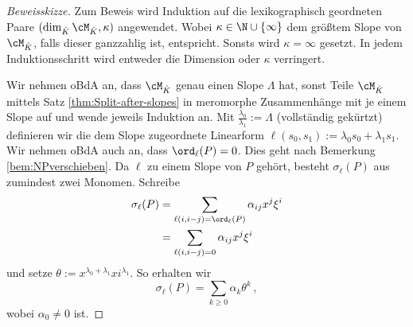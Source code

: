 \begin{proof}[Beweisskizze]
Zum Beweis wird Induktion auf die lexikographisch geordneten Paare
$(\dim_{\hat K}\cM_{\hat K},\kappa)$ angewendet. Wobei
$\kappa\in\N\cup\{\infty\}$ dem größtem Slope von $\cM_{\hat K}$, falls dieser
ganzzahlig ist, entspricht. Sonsts wird $\kappa=\infty$ gesetzt. In jedem
Induktionsschritt wird entweder die Dimension oder $\kappa$ verringert.

\begin{comment}
TODO: Induktionsanfang und -schritt kennzeichnen
\end{comment}
Wir nehmen oBdA an, dass $\cM_{\hat K}$ genau einen Slope $\Lambda$ hat, sonst
Teile $\cM_{\hat K}$ mittels Satz \ref{thm:Split-after-slopes} in meromorphe
Zusammenhänge mit je einem Slope auf und wende jeweils Induktion an.
Mit $\frac{\lambda_0}{\lambda_1}:=\Lambda$ (vollständig gekürtzt) definieren
wir die dem Slope zugeordnete Linearform
$\ell(s_0,s_1):=\lambda_0s_0+\lambda_1s_1$.  
Wir nehmen oBdA auch an, dass $\ord_\ell(P)=0$. Dies geht nach Bemerkung
\ref{bem:NPverschieben}.
Da $\ell$ zu einem Slope von
$P$ gehört, besteht $\sigma_\ell(P)$ aus zumindest zwei Monomen.
Schreibe
\begin{align*}
\sigma_\ell(P)&=\sum_{\ell(i,i-j)=\ord_\ell(P)}\alpha_{ij}x^j\xi^i\\
  &=\sum_{\ell(i,i-j)=0}\alpha_{ij}x^j\xi^i
\end{align*}
und setze $\theta:=x^{\lambda_0+\lambda_1}xi^{\lambda_1}$. So erhalten wir
\[
\sigma_\ell(P) = \sum_{k\geq 0}\alpha_k\theta^k \,,
\]
wobei $\alpha_0\neq0$ ist.


\end{proof}
